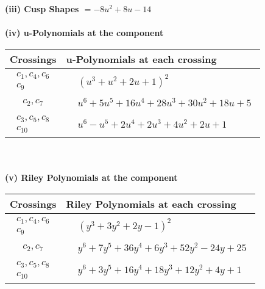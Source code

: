 \documentclass[1p]{elsarticle_modified}
\theoremstyle{definition}
\begin{document}
\flushleft \textbf{(iii) Cusp Shapes $= -8 u^2+8 u-14$}\\~\\
\newpage\renewcommand{\arraystretch}{1}
\flushleft \textbf{(iv) u-Polynomials at the component}\newline \\
\begin{tabular}{m{50pt}|m{274pt}}
Crossings & \hspace{64pt}u-Polynomials at each crossing \\
\hline $$\begin{aligned}c_{1},c_{4},c_{6}\\c_{9}\end{aligned}$$&$\begin{aligned}
&(u^3+u^2+2 u+1)^2
\end{aligned}$\\
\hline $$\begin{aligned}c_{2},c_{7}\end{aligned}$$&$\begin{aligned}
&u^6+5 u^5+16 u^4+28 u^3+30 u^2+18 u+5
\end{aligned}$\\
\hline $$\begin{aligned}c_{3},c_{5},c_{8}\\c_{10}\end{aligned}$$&$\begin{aligned}
&u^6- u^5+2 u^4+2 u^3+4 u^2+2 u+1
\end{aligned}$\\
\hline
\end{tabular}\\~\\
\newpage\renewcommand{\arraystretch}{1}
\flushleft \textbf{(v) Riley Polynomials at the component}\newline \\
\begin{tabular}{m{50pt}|m{274pt}}
Crossings & \hspace{64pt}Riley Polynomials at each crossing \\
\hline $$\begin{aligned}c_{1},c_{4},c_{6}\\c_{9}\end{aligned}$$&$\begin{aligned}
&(y^3+3 y^2+2 y-1)^2
\end{aligned}$\\
\hline $$\begin{aligned}c_{2},c_{7}\end{aligned}$$&$\begin{aligned}
&y^6+7 y^5+36 y^4+6 y^3+52 y^2-24 y+25
\end{aligned}$\\
\hline $$\begin{aligned}c_{3},c_{5},c_{8}\\c_{10}\end{aligned}$$&$\begin{aligned}
&y^6+3 y^5+16 y^4+18 y^3+12 y^2+4 y+1
\end{aligned}$\\
\hline
\end{tabular}\\~\\
\end{document}
